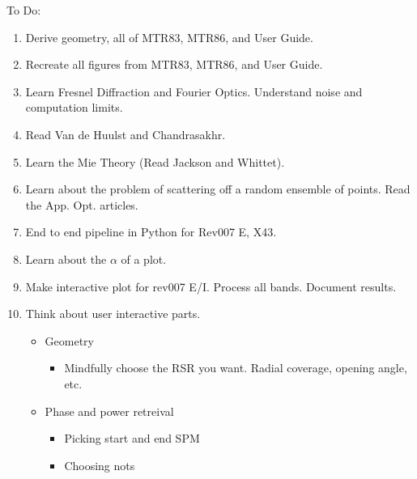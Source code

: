 \documentclass[crop=false,class=article,oneside]{standalone}
\begin{document}
        To Do:
        \begin{enumerate}
            \item Derive geometry, all of MTR83, MTR86, and User Guide.
            \item Recreate all figures from MTR83, MTR86, and User Guide.
            \item Learn Fresnel Diffraction and Fourier Optics.
                  Understand noise and computation limits.
            \item Read Van de Huulst and Chandrasakhr.
            \item Learn the Mie Theory (Read Jackson and Whittet).
            \item Learn about the problem of scattering off a random
                  ensemble of points. Read the App. Opt. articles.
            \item End to end pipeline in Python for Rev007 E, X43.
            \begin{itemize}
            \end{itemize}
            \item Learn about the $\alpha$ of a plot.
            \item Make interactive plot for rev007 E/I. Process all bands.
                  Document results.
            \item Think about user interactive parts.
            \begin{itemize}
                \item Geometry
                \begin{itemize}
                    \item Mindfully choose the RSR you want. Radial coverage, opening angle, etc.
                \end{itemize}
                \item Phase and power retreival
                \begin{itemize}
                    \item Picking start and end SPM
                    \item Choosing nots

\end{itemize}
\end{itemize}
\end{enumerate}
\end{document}
